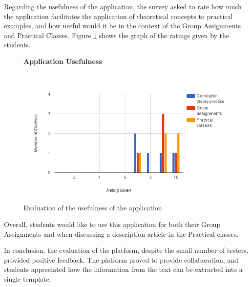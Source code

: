 Regarding the usefulness of the application, the survey asked to rate how much the application facilitates the application of theoretical concepts to practical examples, and how useful would it be in the context of the Group Assignments and Practical Classes. Figure \ref{figure:usefulnessEvaluation} shows the graph of the ratings given by the students.
\begin{figure}[h]
\centering
\begin{normalsize}
\textbf{Application Usefulness}\\
\end{normalsize}
\scriptsize
\includegraphics[scale=0.5]{images/graph3}
\caption{Evaluation of the usefulness of the application}
\label{figure:usefulnessEvaluation}
\end{figure}

Overall, students would like to use this application for both their Group Assignments and when discussing a description article in the Practical classes. 

In conclusion, the evaluation of the platform, despite the small number of testers, provided positive feedback. The platform proved to provide collaboration, and students appreciated how the information from the text can be extracted into a single template. 

